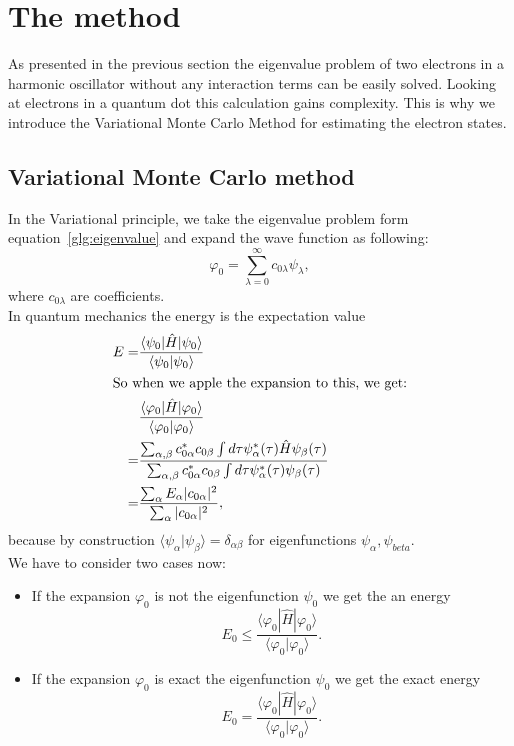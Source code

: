 \section{The method}\label{sec:algo}
As presented in the previous section the eigenvalue problem of two electrons in a harmonic oscillator without any interaction terms can be easily solved. Looking at electrons in a quantum dot this calculation gains complexity. This is why we introduce the Variational Monte Carlo Method for estimating the electron states.
\subsection{Variational Monte Carlo method}
In the Variational principle, we take the eigenvalue problem form equation~\ref{glg:eigenvalue} and expand the wave function as following:
\begin{equation}
\varphi_0 = \sum_{\lambda=0}^{\infty} c_{0 \lambda} \psi_{\lambda},
\end{equation}
where $c_{0 \lambda}$ are coefficients.\\
In quantum mechanics the energy is the expectation value
\begin{align}
E = &\frac{\langle \psi_0 | \hat{H} | \psi_0 \rangle}{\langle \psi_0 | \psi_0 \rangle}\\
\intertext{So when we apple the expansion to this, we get:}
&\frac{\langle \varphi_0 | \hat{H} | \varphi_0 \rangle}{\langle \varphi_0 | \varphi_0 \rangle}\\
= &\frac{\sum_{\alpha,\beta}c_{0\alpha}^*c_{0 \beta} \int d\tau \psi_{\alpha}^*(\tau)\hat{H}\psi_{\beta}(\tau)}{\sum_{\alpha,\beta}c_{0\alpha}^*c_{0 \beta} \int d\tau \psi_{\alpha}^*(\tau)\psi_{\beta}(\tau)}\\
= &\frac{\sum_{\alpha} E_{\alpha} |c_{0\alpha}|^2}{\sum_{\alpha} |c_{0\alpha}|^2},
\end{align}
because by construction $\langle\psi_{\alpha}| \psi_{\beta}\rangle = \delta_{\alpha \beta}$ for eigenfunctions $\psi_{\alpha},\psi_{beta}$.\\
We have to consider two cases now:
\begin{itemize}
\item If the expansion $\varphi_0$ is not the eigenfunction $\psi_0$ we get the an energy
\begin{equation}
E_0 \leqslant \frac{\langle \varphi_0 | \hat{H} | \varphi_0 \rangle}{\langle \varphi_0 | \varphi_0 \rangle}.
\end{equation}
\item If the expansion $\varphi_0$ is exact the eigenfunction $\psi_0$ we get the exact energy
\begin{equation}
E_0 = \frac{\langle \varphi_0 | \hat{H} | \varphi_0 \rangle}{\langle \varphi_0 | \varphi_0 \rangle}.
\end{equation}
\end{itemize}
